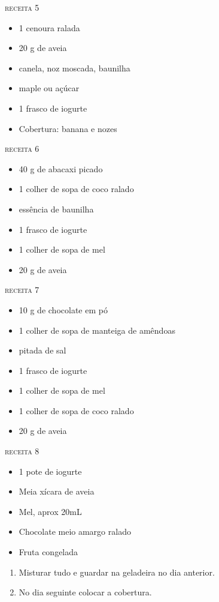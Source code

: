{	\textsc{receita 5}
	\begin{itemize}
		\item 1 cenoura ralada
		\item 20 g de aveia
		\item canela, noz moscada, baunilha
		\item maple ou açúcar
		\item 1 frasco de iogurte
		\item Cobertura: banana e nozes
	\end{itemize}

	\textsc{receita 6}
	\begin{itemize}
		\item 40 g de abacaxi picado
		\item 1 colher de sopa de coco ralado
		\item essência de baunilha
		\item 1 frasco de iogurte
		\item 1 colher de sopa de mel
		\item 20 g de aveia
	\end{itemize}
}{

	\textsc{receita 7}
	\begin{itemize}
		\item 10 g de chocolate em pó
		\item 1 colher de sopa de manteiga de amêndoas
		\item pitada de sal
		\item 1 frasco de iogurte
		\item 1 colher de sopa de mel
		\item 1 colher de sopa de coco ralado
		\item 20 g de aveia
	\end{itemize}

	\textsc{receita 8}
	\begin{itemize}
		\item 1 pote de iogurte
		\item Meia xícara de aveia
		\item Mel, aprox 20mL
		\item Chocolate meio amargo ralado
		\item Fruta congelada
	\end{itemize}

} {
	\begin{enumerate}
		\item Misturar tudo e guardar na geladeira no dia anterior.
		\item No dia seguinte colocar a cobertura.
	\end{enumerate} }